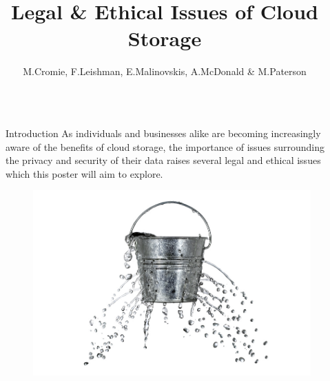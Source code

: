 \documentclass[final]{beamer}
\title{Legal \& Ethical Issues of Cloud Storage} %
\author{M.Cromie, F.Leishman, E.Malinovskis, A.McDonald \& M.Paterson} %
\institute{School of Computing Science, University of Glasgow} %
\newlength{\sepwid}
\newlength{\onecolwid}
\begin{document}

\setlength{\belowcaptionskip}{2ex} %
\setlength\belowdisplayshortskip{2ex} %

\begin{frame}[t] %

\begin{columns}[t] %

\begin{column}{\sepwid}\end{column} %

\begin{column}{\onecolwid} %


\begin{alertblock}{Introduction}
As individuals and businesses alike are becoming increasingly aware of the benefits of cloud storage, the importance of issues surrounding the privacy and security of their data raises several legal and ethical issues which this poster will aim to explore.
\end{alertblock}

\begin{figure}
\includegraphics[width=0.8\linewidth]{leak.jpg}
\end{figure}





\end{column}
\end{columns}
\end{frame}
\end{document}
